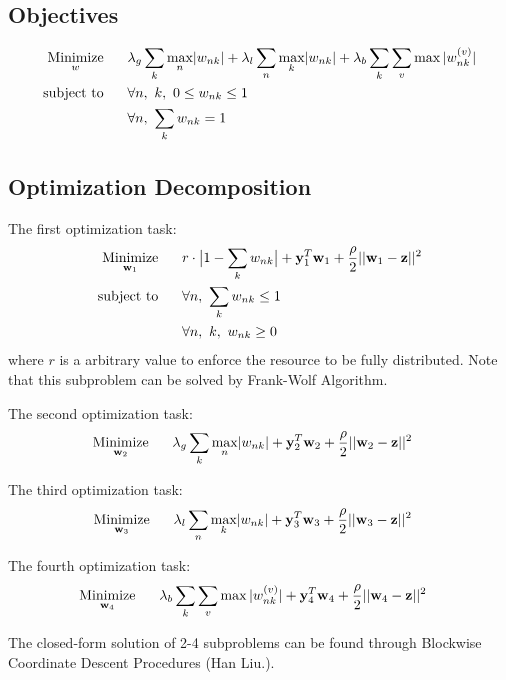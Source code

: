 \documentclass{article} %
\newcommand{\LTwoNorm}[1]{||#1||^{2}}
\newcommand{\sumn}{\sum_{n}}
\newcommand{\sumk}{\sum_{k}}
\newcommand{\wnk}{w_{nk}}
\newcommand{\wone}{\mathbf{w}_1}
\newcommand{\wtwo}{\mathbf{w}_2}
\newcommand{\wthree}{\mathbf{w}_3}
\newcommand{\wfour}{\mathbf{w}_4}
\newcommand{\w}{\mathbf{w}}
\newcommand{\maxn}{ \underset{n}{\text{max}} }
\newcommand{\maxk}{ \underset{k}{\text{max}} }
\newcommand{\z}{\mathbf{z}}
\newcommand{\quadraterm}[1]{\frac{\rho}{2}\LTwoNorm{\w_{#1}-\z}}
\newcommand{\minimize}[1]{ \underset{#1}{\text{Minimize}} }
\newcommand{\subjectto}{ \text{subject to} }
\newcommand{\hs}{\hspace*{0.6cm}}
\begin{document}
\subsection{Objectives}
\begin{align}
   \minimize{w}
   \hs & \lambdag \sumk \maxn |\wnk| 
        + \lambdal \sumn \maxk |\wnk| 
        + \lambdab \sumk \sum_v \max |\wnk^{(v)}| \\
   \subjectto
   \hs & \forall n,\ k,\ 0 \leq  \wnk \leq 1 \\
    \hs & \forall n,\ \sumk \wnk = 1
\end{align}

 \subsection{Optimization Decomposition} \label{nseparate}

The first optimization task:
  \begin{align}
   \minimize{\wone}
   \hs & r \cdot \big| 1 - \sumk \wnk \big|   %
   + \mutw{1} + \quadraterm{1} \\
   \subjectto
   \hs & \forall n,\ \sumk \wnk \leq 1 \\
   \hs & \forall n,\ k,\ \wnk \geq 0
 \end{align}
 where $r$ is a arbitrary value to enforce the resource to be fully
 distributed. Note that this subproblem can be solved by Frank-Wolf Algorithm. 

 The second optimization task:
 \begin{align} \label{second}
   \minimize{\wtwo}
   \hs & \lambdag \sumk \maxn |\wnk|  %
   + \mutw{2} + \quadraterm{2} 
 \end{align}

  The third optimization task:
 \begin{align} \label{second}
   \minimize{\wthree}
   \hs & \lambdal \sumn \maxk |\wnk|  %
   + \mutw{3} + \quadraterm{3} 
 \end{align}

   The fourth optimization task:
 \begin{align} \label{second}
   \minimize{\wfour}
   \hs &  \lambdab \sumk \sum_v \max |\wnk^{(v)}|  %
   + \mutw{4} + \quadraterm{4} 
 \end{align}

 The closed-form solution of 2-4 subproblems can be found through Blockwise
 Coordinate Descent Procedures (Han Liu.). 
\end{document}
